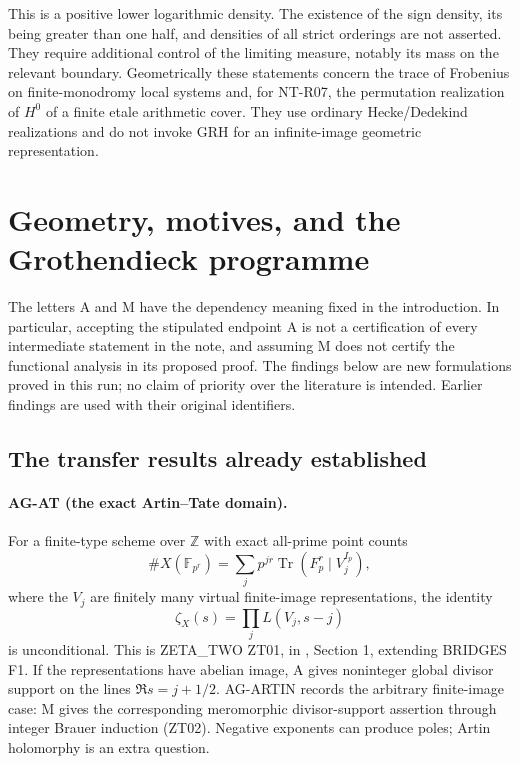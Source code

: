 \documentclass[11pt,a4paper]{article}
\begin{document}
This is a positive lower logarithmic density. The existence of the
sign density, its being greater than one half, and densities of all
strict orderings are not asserted. They require additional control
of the limiting measure, notably its mass on the relevant boundary.
Geometrically these statements concern the trace of Frobenius on
finite-monodromy local systems and, for NT-R07, the permutation
realization of $H^0$ of a finite etale arithmetic cover. They use
ordinary Hecke/Dedekind realizations and do not invoke GRH for an
infinite-image geometric representation.


\section{Geometry, motives, and the Grothendieck programme}
\label{sec:geometry}

The letters A and M have the dependency meaning fixed in the introduction.
In particular, accepting the stipulated endpoint A is not a certification of
every intermediate statement in the note, and assuming M does not certify
the functional analysis in its proposed proof. The findings below are new
formulations proved in this run; no claim of priority over the literature is
intended. Earlier findings are used with their original identifiers.

\subsection{The transfer results already established}
\label{ag:transfer}

\paragraph{AG-AT (the exact Artin--Tate domain).}
For a finite-type scheme over $\mathbb Z$ with exact all-prime point counts
\[
 \#X(\mathbb F_{p^r})=
 \sum_j p^{jr}\operatorname{Tr}(F_p^r\mid V_j^{I_p}),
\]
where the $V_j$ are finitely many virtual finite-image representations,
the identity
\[
 \zeta_X(s)=\prod_j L(V_j,s-j)
\]
is unconditional. This is ZETA\_TWO ZT01, in
, Section 1,
extending BRIDGES F1. If the representations have abelian image, A gives
noninteger global divisor support on the lines $\Re s=j+1/2$.
AG-ARTIN records the arbitrary finite-image case: M gives the corresponding meromorphic
divisor-support assertion through integer Brauer induction (ZT02).
Negative exponents can produce poles; Artin holomorphy is an extra question.
\end{document}
